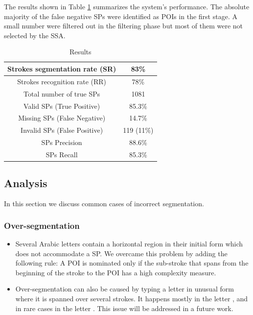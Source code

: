 \documentclass[10pt, conference, compsocconf]{IEEEtran}
\begin{document}
The results shown in Table \ref{table:results} summarizes the system's performance. The absolute majority of the false negative SPs were identified as POIs in the first stage. A small number were filtered out in the filtering phase but most of them were not selected by the SSA.\\

\begin{table}[h]
\caption{Results}
\renewcommand{\arraystretch}{1.2}
\begin{tabular}{ | c | c | }
  \hline
  Strokes segmentation rate (SR) &  83\% \\ 
  \hline
  Strokes recognition rate (RR) &  78\% \\ 
 \hline
  Total number of true SPs & 1081 \\
  \hline
  Valid SPs (True Positive) & 85.3\% \\
    \hline
  Missing SPs (False Negative) & 14.7\% \\
  \hline
  Invalid SPs (False Positive) & 119 (11\%) \\
  \hline                                    
  SPs Precision & 88.6\% \\ 
 \hline
  SPs Recall &  85.3\% \\ 
 \hline
\end{tabular}
\centering
\label{table:results} 
\end{table}

\subsection{Analysis}
In this section we discuss common cases of incorrect segmentation.
\subsubsection{Over-segmentation}
\begin{itemize}
\item Several Arabic letters contain a horizontal region in their initial form which does not accommodate a SP. We overcame this problem by adding the following rule: A POI is nominated only if the sub-stroke that spans from the beginning of the stroke to the POI has a high complexity measure.
\item Over-segmentation can also be caused by typing a letter in unusual form where it is spanned over several strokes. 
It happens mostly in the letter ,  and in rare cases in the letter . This issue will be addressed in a future work.
\end{itemize}
\end{document}
